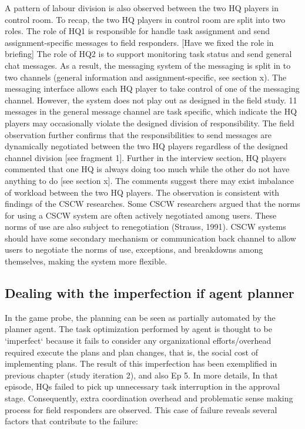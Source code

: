 A pattern of labour division is also observed between the two HQ players in control room. To recap, the two HQ players in control room are split into two roles. The role of HQ1 is responsible for handle task assignment and send assignment-specific messages to field responders. [Have we fixed the role in briefing] The role of HQ2 is to support monitoring task status and send general chat messages. As a result, the messaging system of the messaging is split in to two channels (general information and assignment-specific, see section x). The messaging interface allows each HQ player to take control of one of the messaging channel.  However, the system does not play out as designed in the field study. 11 messages in the general message channel are task specific, which indicate the HQ players may occasionally violate the designed division of responsibility. The field observation further confirms that the responsibilities to send messages are dynamically negotiated between the two HQ players regardless of the designed channel division [see fragment 1]. Further in the interview section, HQ players commented that one HQ is always doing too much while the other do not have anything to do [see section x]. The comments suggest there may exist imbalance of workload between the two HQ players. The observation is consistent with findings of the CSCW researches. Some CSCW researchers argued that the norms for using a CSCW system are often actively negotiated among users. These norms of use are also subject to renegotiation (Strauss, 1991). CSCW systems should have some secondary mechanism or communication back channel to allow users to negotiate the norms of use, exceptions, and breakdowns among themselves, making the system more flexible.

\subsection{Dealing with the imperfection if agent planner}\label{sec:huilimperfection}

In the game probe, the planning can be seen as partially automated by the planner agent. The task optimization performed by agent is thought to be `imperfect` because it fails to consider any organizational efforts/overhead required execute the plans and plan changes, that is, the social cost of implementing plans. The result of this imperfection has been exemplified in previous chapter (study iteration 2), and also Ep 5. In more details, In that episode, HQs failed to pick up unnecessary task interruption in the approval stage. Consequently, extra coordination overhead and problematic sense making process for field responders are observed. This case of failure reveals several factors that contribute to the failure: \\

